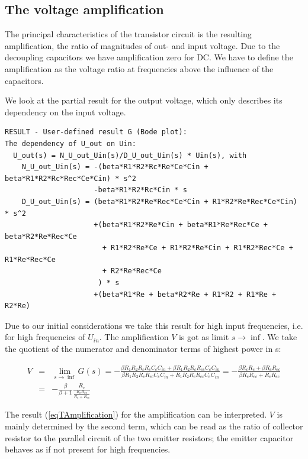 \subsection{The voltage amplification}

The principal characteristics of the transistor circuit is the resulting
amplification, the ratio of magnitudes of out- and input voltage. Due to
the decoupling capacitors we have amplification zero for DC. We have to
define the amplification as the voltage ratio at frequencies above the
influence of the capacitors.

We look at the partial result for the output voltage, which only describes
its dependency on the input voltage.

\begin{verbatim}
RESULT - User-defined result G (Bode plot):
The dependency of U_out on Uin:
  U_out(s) = N_U_out_Uin(s)/D_U_out_Uin(s) * Uin(s), with
    N_U_out_Uin(s) = -(beta*R1*R2*Rc*Re*Ce*Cin + beta*R1*R2*Rc*Rec*Ce*Cin) * s^2
                     -beta*R1*R2*Rc*Cin * s
    D_U_out_Uin(s) = (beta*R1*R2*Re*Rec*Ce*Cin + R1*R2*Re*Rec*Ce*Cin) * s^2
                     +(beta*R1*R2*Re*Cin + beta*R1*Re*Rec*Ce + beta*R2*Re*Rec*Ce
                       + R1*R2*Re*Ce + R1*R2*Re*Cin + R1*R2*Rec*Ce + R1*Re*Rec*Ce
                       + R2*Re*Rec*Ce
                      ) * s
                     +(beta*R1*Re + beta*R2*Re + R1*R2 + R1*Re + R2*Re)
\end{verbatim}

Due to our initial considerations we take this result for high input
frequencies, i.e. for high frequencies of $U_{in}$. The amplification $V$
is got as limit $s \to \inf$. We take the quotient of the numerator and
denominator terms of highest power in s:

\begin{eqnarray}
V & = & \lim_{s \to \inf}G(s)
        = - \frac{\beta R_1 R_2 R_c R_e C_e C_{in} + \beta R_1 R_2 R_c R_{ec} C_e C_{in}}
                 {\beta R_1 R_2 R_e R_{ec} C_e C_{in} + R_1 R_2 R_e R_{ec} C_e C_{in}}
        = - \frac{\beta R_c R_e + \beta R_c R_{ec}}{\beta R_e R_{ec} + R_e R_{ec}}
\nonumber \\
  & = & - \frac{\beta}{\beta+1} \frac{R_c}{\frac{R_e R_{ec}}{R_e+R_{ec}}}
\label{eqTAmplification}
\end{eqnarray}

The result (\ref{eqTAmplification}) for the amplification can be
interpreted. $V$ is mainly determined by the second term, which can be
read as the ratio of collector resistor to the parallel circuit of the two
emitter resistors; the emitter capacitor behaves as if not present for
high frequencies.

